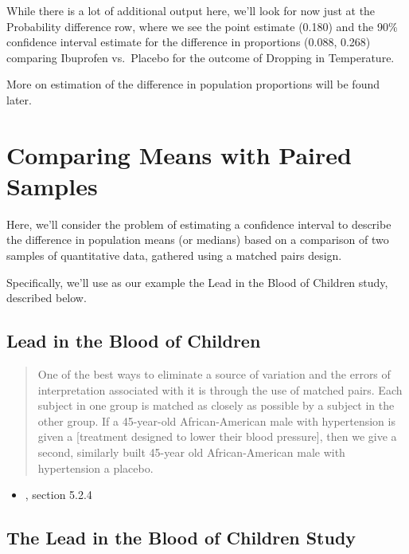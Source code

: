 \documentclass[
]{book}
\providecommand{\tightlist}{%
  \setlength{\itemsep}{0pt}\setlength{\parskip}{0pt}}
\begin{document}
While there is a lot of additional output here, we'll look for now just at the Probability difference row, where we see the point estimate (0.180) and the 90\% confidence interval estimate for the difference in proportions (0.088, 0.268) comparing Ibuprofen vs.~Placebo for the outcome of Dropping in Temperature.

More on estimation of the difference in population proportions will be found later.

\hypertarget{comparing-means-with-paired-samples}{%
\chapter{Comparing Means with Paired Samples}\label{comparing-means-with-paired-samples}}

Here, we'll consider the problem of estimating a confidence interval to describe the difference in population means (or medians) based on a comparison of two samples of quantitative data, gathered using a matched pairs design.

Specifically, we'll use as our example the Lead in the Blood of Children study, described below.

\hypertarget{lead-in-the-blood-of-children}{%
\section{Lead in the Blood of Children}\label{lead-in-the-blood-of-children}}

\begin{quote}
One of the best ways to eliminate a source of variation and the errors of interpretation associated with it is through the use of matched pairs. Each subject in one group is matched as closely as possible by a subject in the other group. If a 45-year-old African-American male with hypertension is given a {[}treatment designed to lower their blood pressure{]}, then we give a second, similarly built 45-year old African-American male with hypertension a placebo.
\end{quote}

\begin{itemize}
\tightlist
\item
  \citet{Good2005}, section 5.2.4
\end{itemize}

\hypertarget{the-lead-in-the-blood-of-children-study}{%
\section{The Lead in the Blood of Children Study}\label{the-lead-in-the-blood-of-children-study}}
\end{document}
